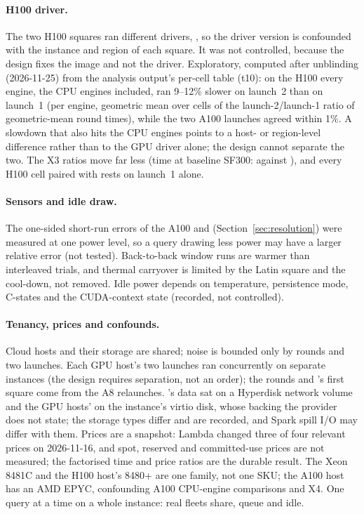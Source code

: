 \documentclass[sigconf]{acmart}
\begin{document}
\paragraph{H100 driver.} The two H100 squares ran different drivers, , so the
driver version is confounded with the instance and region of each square. It was not controlled, because
the design fixes the image and not the driver.
Exploratory, computed after unblinding (2026-11-25) from the analysis output's per-cell table (t10): on
the H100 every engine, the CPU engines included, ran 9--12\% slower on launch~2 than on launch~1 (per
engine, geometric mean over cells of the launch-2/launch-1 ratio of geometric-mean round times), while the two A100 launches agreed within 1\%. A slowdown that also hits the CPU engines points
to a host- or region-level difference rather than to the GPU driver alone; the design cannot separate
the two. The X3 ratios move far less (time at baseline SF300:
 against
), and every H100 cell paired with \CG{} rests on launch~1 alone.

\paragraph{Sensors and idle draw.} The one-sided short-run errors of the A100 and \CG{}
(Section~\ref{sec:resolution}) were measured at one power level, so a query drawing less power may
have a larger relative error (not tested).
Back-to-back window runs are warmer than interleaved trials, and thermal carryover is limited by
the Latin square and the cool-down, not removed. Idle power depends on temperature, persistence
mode, C-states and the CUDA-context state (recorded, not controlled).

\paragraph{Tenancy, prices and confounds.} Cloud hosts and their storage are shared; noise is
bounded only by rounds and two launches. Each GPU host's two launches ran concurrently on separate
instances (the design requires separation, not an order); the \CV{} rounds and \CG's first square
come from the A8 relaunches. \CG's data sat on a Hyperdisk network volume and the GPU hosts' on the
instance's virtio disk, whose backing the provider does not state; the storage types differ and are
recorded, and Spark spill I/O may differ with them. Prices are a snapshot: Lambda changed three of four
relevant prices on 2026-11-16, and spot, reserved and committed-use prices are not measured; the
factorised time and price ratios are the durable result. The \CG{} Xeon 8481C and the H100 host's 8480+ are one
family, not one SKU; the A100 host has an AMD EPYC, confounding A100 CPU-engine comparisons and
X4. One query at a time on a whole instance: real fleets share, queue and idle.
\end{document}
